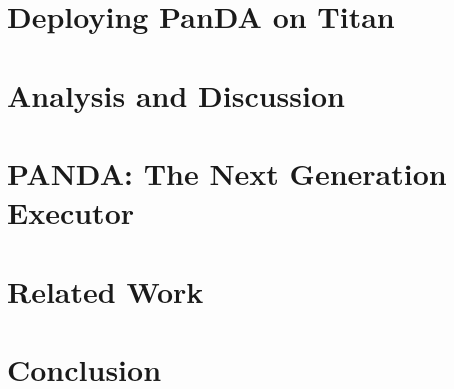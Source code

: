 \documentclass[conference]{IEEEtran}
\begin{document}
\section{Deploying PanDA on Titan}\label{sec:panda_titan}



\section{Analysis and Discussion}\label{sec:analysis}



\section{PANDA\@: The Next Generation Executor}\label{sec:panda_roadmap}




\section{Related Work}\label{sec:related}



\section{Conclusion}\label{sec:conclusion}






\end{document}
